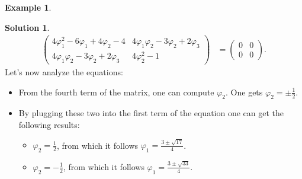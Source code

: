 \documentclass[a4paper,12 pt]{article}
\numberwithin{equation}{section}
\theoremstyle{definition}
\newtheorem{bsp}{Example}
\theoremstyle{remark}
\theoremstyle{definition}
\newtheorem*{lsg}{Solution}
\theoremstyle{definition}
\theoremstyle{definition}
\theoremstyle{remark}
\begin{document}
\begin{bsp}
\begin{lsg}
\begin{equation*}
\begin{split}
\begin{pmatrix}
4\varphi_1^2-6\varphi_1+4\varphi_2-4 & 4\varphi_1 \varphi_2 - 3\varphi_2+2\varphi_3\\
4\varphi_1 \varphi_2 - 3\varphi_2+2\varphi_3 & 4\varphi_2^2-1 
\end{pmatrix}&=\begin{pmatrix} 0&0 \\ 0&0 \end{pmatrix}.
\end{split}
\end{equation*}
Let's now analyze the equations:
\begin{itemize}
\item From the fourth term of the matrix, one can compute $\varphi_2$. One gets $\varphi_2=\pm \frac{1}{2}$. 
\item By plugging these two into the first term of the equation one can get the following results:
\begin{itemize}
\item $\varphi_2=\frac{1}{2}$, from which it follows $\varphi_1=\frac{3\pm \sqrt{17}}{4}$.
\item $\varphi_2=-\frac{1}{2}$, from which it follows $\varphi_1=\frac{3\pm \sqrt{33}}{4}$.
\end{itemize}


\end{itemize}
\end{lsg}
\end{bsp}
\end{document}
